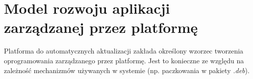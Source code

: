 \documentclass[polish,12pt]{aghthesis}
\begin{document}
\centerline{
}

\section{Model rozwoju aplikacji zarządzanej przez platformę}
Platforma do automatycznych aktualizacji zakłada określony wzorzec tworzenia oprogramowania zarządzanego przez platformę. Jest to konieczne ze względu na zależność mechanizmów używanych w systemie (np. paczkowania w pakiety \emph{.deb}).
\end{document}
